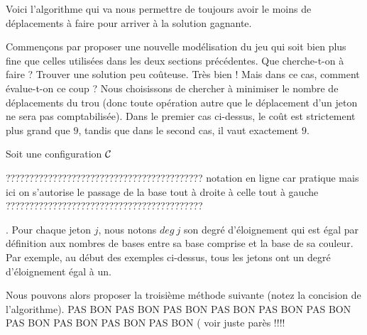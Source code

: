 Voici l'algorithme qui va nous permettre de toujours avoir le moins de déplacements à faire pour arriver à la solution gagnante.


Commençons par proposer une nouvelle modélisation du jeu qui soit bien plus fine que celles utilisées dans les deux sections précédentes. 
Que cherche-t-on à faire ? Trouver une solution peu coûteuse. Très bien ! Mais dans ce cas, comment évalue-t-on ce coup ? Nous choisissons de chercher à minimiser le nombre de déplacements du trou (donc toute opération autre que le déplacement d'un jeton ne sera pas comptabilisée).
Dans le premier cas ci-dessus, le coût est strictement plus grand que $9$, tandis que dans le second cas, il vaut exactement $9$. 


\medskip

Soit une configuration $\cal C$

??????????????????????????????????????????
notation en ligne car pratique mais ici on s'autorise le passage de la base tout à droite à celle tout à gauche
??????????????????????????????????????????

. Pour chaque jeton $j$, nous notons $deg \ j$ son degré d'éloignement qui est égal par définition aux nombres de bases entre sa base comprise et la base de sa couleur.
Par exemple, au début des exemples ci-dessus, tous les jetons ont un degré d'éloignement égal à un.


\medskip

Nous pouvons alors proposer la troisième méthode suivante (notez la concision de l'algorithme).   PAS BON PAS BON PAS BON PAS BON PAS BON PAS BON PAS BON PAS BON PAS BON PAS BON ( voir juste parès !!!!

\bigskip

\begin{algo}
	\vspace{0.4em}
\end{algo}


